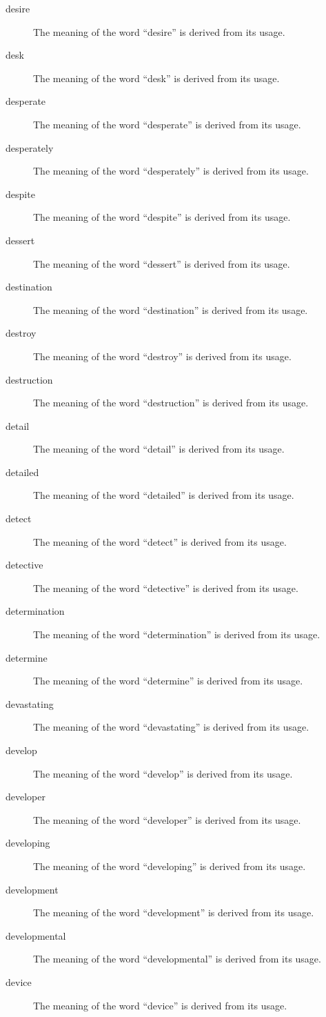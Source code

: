 \documentclass[12pt, letterpaper]{memoir}
\begin{document}
\begin{description}
\item[desire] The meaning of the word ``desire'' is derived from its usage.
\item[desk] The meaning of the word ``desk'' is derived from its usage.
\item[desperate] The meaning of the word ``desperate'' is derived from its usage.
\item[desperately] The meaning of the word ``desperately'' is derived from its usage.
\item[despite] The meaning of the word ``despite'' is derived from its usage.
\item[dessert] The meaning of the word ``dessert'' is derived from its usage.
\item[destination] The meaning of the word ``destination'' is derived from its usage.
\item[destroy] The meaning of the word ``destroy'' is derived from its usage.
\item[destruction] The meaning of the word ``destruction'' is derived from its usage.
\item[detail] The meaning of the word ``detail'' is derived from its usage.
\item[detailed] The meaning of the word ``detailed'' is derived from its usage.
\item[detect] The meaning of the word ``detect'' is derived from its usage.
\item[detective] The meaning of the word ``detective'' is derived from its usage.
\item[determination] The meaning of the word ``determination'' is derived from its usage.
\item[determine] The meaning of the word ``determine'' is derived from its usage.
\item[devastating] The meaning of the word ``devastating'' is derived from its usage.
\item[develop] The meaning of the word ``develop'' is derived from its usage.
\item[developer] The meaning of the word ``developer'' is derived from its usage.
\item[developing] The meaning of the word ``developing'' is derived from its usage.
\item[development] The meaning of the word ``development'' is derived from its usage.
\item[developmental] The meaning of the word ``developmental'' is derived from its usage.
\item[device] The meaning of the word ``device'' is derived from its usage.

\end{description}
\end{document}
